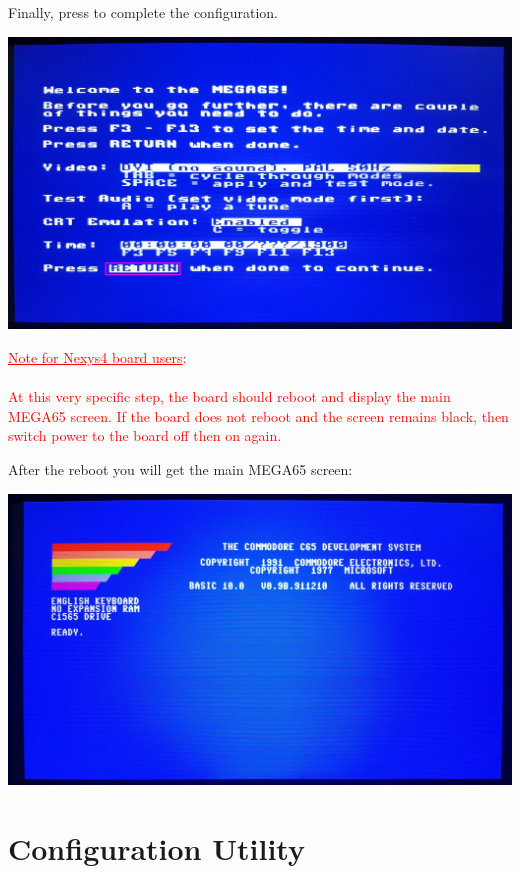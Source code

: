 Finally, press  to complete the configuration.

\begin{center}
  \includegraphics[width=\linewidth]{images/img011_final_boot_05.png}
\end{center}

\textcolor{red}{\underline{Note for Nexys4 board users}: \\
\\
  At this very specific step, the board should reboot and display the main MEGA65 screen. If the board does not reboot and the screen remains black, then switch power to the board off then on again.}

After the reboot you will get the main MEGA65 screen:

\begin{center}
  \includegraphics[width=\linewidth]{images/img011_final_boot_06.jpg}
\end{center}

\section{Configuration Utility}

